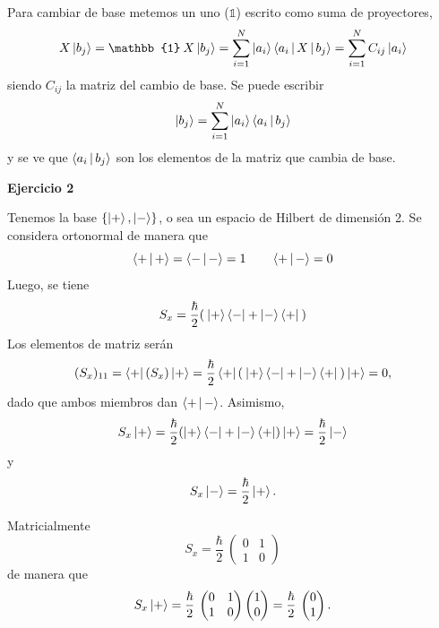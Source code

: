 \documentclass[10pt,oneside]{CBFT_book}
\begin{document}
Para cambiar de base metemos un uno ($\mathbb{1}$) escrito como suma de proyectores,
\[
	X\Ket{b_j} = \mathbb{1} \: X\Ket{b_j} = \sum_{i=1}^N \Ket{a_i}\Braket{a_i|X|b_j} = 
	\sum_{i=1}^N C_{ij} \Ket{a_i}
\]
siendo $C_{ij}$ la matriz del cambio de base.
Se puede escribir
\[
	\Ket{b_j} = \sum_{i=1}^N \Ket{a_i}\Braket{a_i|b_j} 
\]
y se ve que $\Braket{a_i|b_j}$ son los elementos de la matriz que cambia de base.

\begin{ejemplo}{\bf Ejercicio 2}

Tenemos la base $\{ \Ket{+}, \Ket{-} \}$, o sea un espacio de Hilbert de dimensión 2. Se considera
ortonormal de manera que
\[
	\Braket{+|+} = \Braket{-|-} = 1 \qquad \Braket{+|-} = 0
\]
Luego, se tiene
\[
	S_x = \frac{\hbar}{2} (\: \Ket{+}\Bra{-} + \Ket{-}\Bra{+} \:)
\]
Los elementos de matriz serán
\[
	(S_x)_{11} = \Bra{+} (S_x ) \Ket{+} =
	 \frac{\hbar}{2} \Bra{+} (\: \Ket{+}\Bra{-} + \Ket{-}\Bra{+} \:) \Ket{+} = 0,
\]
dado que ambos miembros dan $\Braket{+|-}$. Asimismo,
\[
	S_x \Ket{+} = \frac{\hbar}{2} ( \Ket{+}\Bra{-} + \Ket{-}\Bra{+} ) \Ket{+} = \frac{\hbar}{2}\Ket{-}
\]
y 
\[
	S_x \Ket{-} = \frac{\hbar}{2}\Ket{+}.
\]

Matricialmente
\[
	S_x = \frac{\hbar}{2} \: \begin{pmatrix}
	0  &  1 \\
	1  &  0
	\end{pmatrix}
\]
de manera que
\[
	S_x \Ket{+} = \frac{\hbar}{2} \: \begin{pmatrix}
	0  &  1 \\
	1  &  0
	\end{pmatrix}
	\begin{pmatrix}
	 1 \\
	 0
	\end{pmatrix}
	=
	\frac{\hbar}{2} \: 
	\begin{pmatrix}
	 0 \\
	 1
	\end{pmatrix}.
\]
 
\end{ejemplo}
\end{document}
